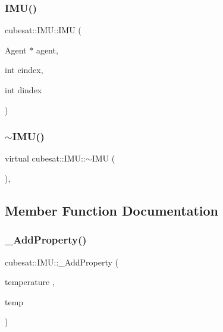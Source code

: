 \subsubsection{\texorpdfstring{I\+M\+U()}{IMU()}}
{\footnotesize\ttfamily cubesat\+::\+I\+M\+U\+::\+I\+MU (\begin{DoxyParamCaption}\item[{Agent $\ast$}]{agent,  }\item[{int}]{cindex,  }\item[{int}]{dindex }\end{DoxyParamCaption})\hspace{0.3cm}{\ttfamily [inline]}}

\mbox{\label{classcubesat_1_1IMU_af9587ba377181ff65d9a3ef5bc19bb24}} 
\subsubsection{\texorpdfstring{$\sim$\+I\+M\+U()}{~IMU()}}
{\footnotesize\ttfamily virtual cubesat\+::\+I\+M\+U\+::$\sim$\+I\+MU (\begin{DoxyParamCaption}{ }\end{DoxyParamCaption})\hspace{0.3cm}{\ttfamily [inline]}, {\ttfamily [virtual]}}



\subsection{Member Function Documentation}
\mbox{\label{classcubesat_1_1IMU_ac48481fb52ed8c9155ccea48484738a2}} 
\subsubsection{\texorpdfstring{\+\_\+\+Add\+Property()}{\_AddProperty()}\hspace{0.1cm}{\footnotesize\ttfamily [1/9]}}
{\footnotesize\ttfamily cubesat\+::\+I\+M\+U\+::\+\_\+\+Add\+Property (\begin{DoxyParamCaption}\item[{temperature}]{,  }\item[{temp}]{ }\end{DoxyParamCaption})}

